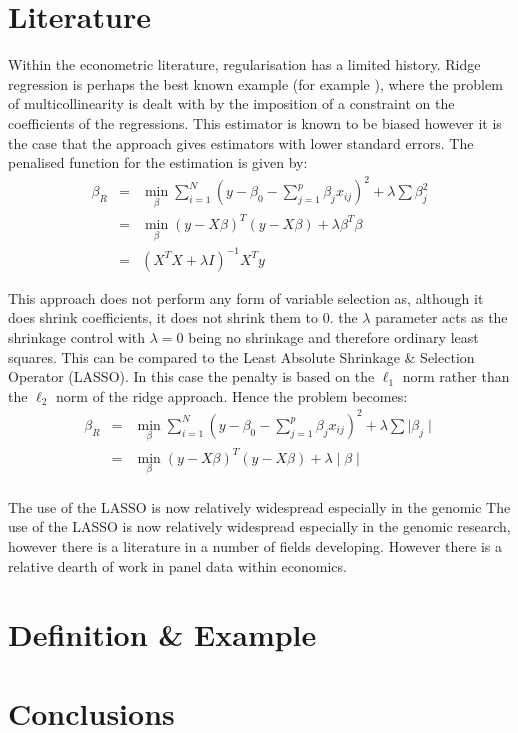 \documentclass[11pt]{article}
\begin{document}
\section{Literature}
Within the econometric literature, regularisation has a limited history. Ridge regression is perhaps the best known example (for example \cite{hoerl1970}), where the problem of multicollinearity is dealt with by the imposition of a constraint on the coefficients of the regressions. This estimator is known to be biased however it is the case that the approach gives estimators with lower standard errors. The penalised function for the estimation is given by:
\begin{eqnarray}
\beta_R&=&\min_\beta \sum_{i=1}^N(y-\beta_0-\sum_{j=1}^p \beta_j x_{ij})^2+\lambda \sum \beta_j^2\\
&=&\min_\beta \left(y-X\beta\right)^T\left(y-X\beta\right)+\lambda\beta^T\beta \nonumber \\
&=&\left(X^TX+\lambda I\right)^{-1}X^T y \nonumber
\end{eqnarray}

This approach does not perform any form of variable selection  as, although it does shrink coefficients, it does not shrink them to 0. the $\lambda$ parameter acts as the shrinkage control with $\lambda=0$ being no shrinkage and therefore ordinary least squares. This can be compared to the Least Absolute Shrinkage \& Selection Operator (LASSO). In this case the penalty is based on the $\ell_1$ norm rather than the $\ell_2$ norm of the ridge approach. Hence the problem becomes:
\begin{eqnarray}
\beta_R&=&\min_\beta \sum_{i=1}^N(y-\beta_0-\sum_{j=1}^p \beta_j x_{ij})^2+\lambda \sum \mid\beta_j\mid\\
&=&\min_\beta \left(y-X\beta\right)^T\left(y-X\beta\right)+\lambda\mid\beta\mid \nonumber \\
\end{eqnarray}

The use of the LASSO is now relatively widespread especially in the genomic 
The use of the LASSO is now relatively widespread especially in the genomic research, however there is a literature in a number of fields developing. However there is a relative dearth of work in panel data within economics.


\section{Definition \& Example}

\section{Conclusions}




\end{document}
